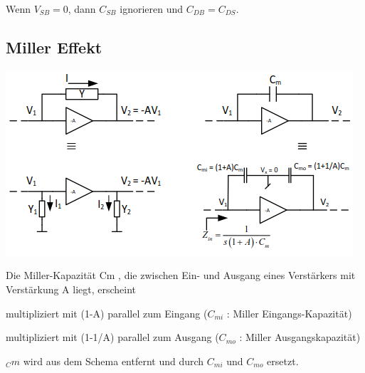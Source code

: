 Wenn $V_{SB}=0$, dann $C_{SB}$ ignorieren und $C_{DB}=C_{DS}$.
\subsection{Miller Effekt}
\begin{minipage}[c]{0.5\textwidth}
	\includegraphics[width=1\linewidth]{chapters/Frequenzverhalten/images/miller}
\end{minipage}
\begin{minipage}[c]{0.5\textwidth}
	Die Miller-Kapazität Cm , die zwischen Ein- und Ausgang eines Verstärkers mit Verstärkung A liegt, erscheint
	\begin{compactitem}
		\item multipliziert mit (1-A) parallel zum Eingang ($C_{mi}$ : Miller Eingangs-Kapazität)
		\item multipliziert mit (1-1/A) parallel zum Ausgang ($C_{mo}$ : Miller Ausgangskapazität)
		\item $_Cm$ wird aus dem Schema entfernt und durch $C_{mi}$ und $C_{mo}$ ersetzt.
	\end{compactitem}
\end{minipage}

